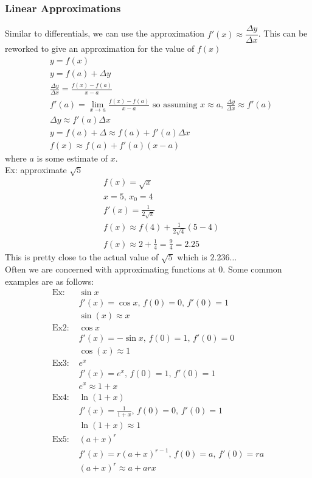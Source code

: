 \subsubsection{Linear Approximations}
Similar to differentials, we can use the approximation $f'(x)\approx \dfrac{\Delta y}{\Delta x}$. This can be reworked to give an approximation for the value of $f(x)$
\begin{align*}
    &y=f(x)\\
    &y=f(a)+\Delta y\\
    &\frac{\Delta y}{\Delta x}=\frac{f(x)-f(a)}{x-a}\\
    &f'(a)=\lim_{x\to a}\frac{f(x)-f(a)}{x-a}\text{ so assuming }x\approx a,\, \frac{\Delta y}{\Delta x}\approx f'(a)\\
    &\Delta y\approx f'(a)\Delta x\\
    &y=f(a)+\Delta \approx f(a)+f'(a)\Delta x\\
    &f(x)\approx f(a)+f'(a)(x-a)
\end{align*}
where $a$ is some estimate of $x$.\\
Ex: approximate $\sqrt{5}$
\begin{align*}
    &f(x)=\sqrt{x}\\
    &x=5,\,x_0=4\\
    &f'(x)=\frac{1}{2\sqrt{x}}\\
    &f(x)\approx f(4)+\frac{1}{2\sqrt{4}}(5-4)\\
    &f(x)\approx 2+\frac{1}{4}=\frac{9}{4}=2.25
\end{align*}
This is pretty close to the actual value of $\sqrt{5}$ which is $2.236\ldots$\\
Often we are concerned with approximating functions at 0. Some common examples are as follows:
\begin{align*}
    \text{Ex: }&\sin x\\
    &f'(x)=\cos x,\,f(0)=0,\,f'(0)=1\\
    &\sin(x)\approx x\\
    \text{Ex2: }&\cos x\\
    &f'(x)=-\sin x,\,f(0)=1,\,f'(0)=0\\
    &\cos(x)\approx 1\\
    \text{Ex3: }&e^x\\
    &f'(x)=e^x,\,f(0)=1,\,f'(0)=1\\
    &e^x\approx 1+x\\
    \text{Ex4: }&\ln(1+x)\\
    &f'(x)=\frac{1}{1+x},\,f(0)=0,\,f'(0)=1\\
    &\ln(1+x)\approx 1\\
    \text{Ex5: }&(a+x)^r\\
    &f'(x)=r(a+x)^{r-1},\,f(0)=a,\,f'(0)=ra\\
    &(a+x)^r\approx a+arx
\end{align*}

